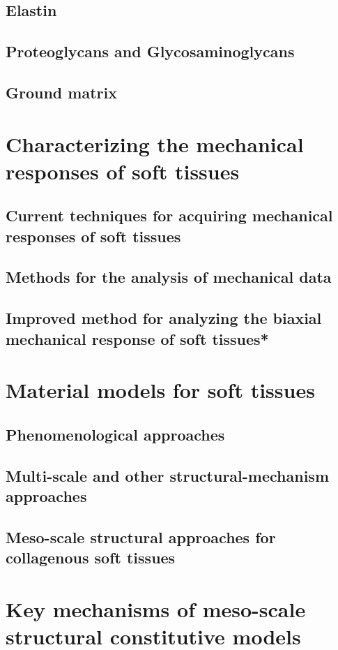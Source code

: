 \subsection{Elastin}
\subsection{Proteoglycans and Glycosaminoglycans}
\subsection{Ground matrix}

\section{Characterizing the mechanical responses of soft tissues}
\subsection{Current techniques for acquiring mechanical responses of soft tissues}
\subsection{Methods for the analysis of mechanical data}
\subsection{Improved method for analyzing the biaxial mechanical response of soft tissues*}

\section{Material models for soft tissues}
\subsection{Phenomenological approaches}
\subsection{Multi-scale and other structural-mechanism approaches}
\subsection{Meso-scale structural approaches for collagenous soft tissues}

\section{Key mechanisms of meso-scale structural constitutive models}
